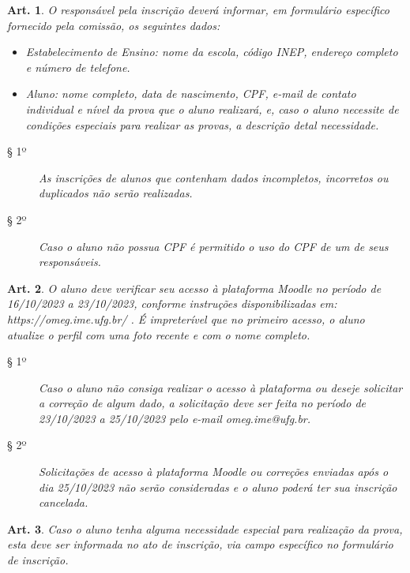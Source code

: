 \documentclass[a4paper,12pt]{article}
\newtheorem{article}{Art.}
\begin{document}
\begin{article}
  O responsável pela inscrição deverá informar, em formulário específico
  fornecido pela comissão, os seguintes dados:
  \begin{itemize}
    \item
      Estabelecimento de Ensino: nome da escola, código INEP, endereço
      completo e número de telefone.
    \item
      Aluno: nome completo, data de nascimento, CPF, e-mail de contato
      individual e nível da prova que o aluno realizará, e, caso o aluno
      necessite de condições especiais para realizar as provas, a descrição
      detal necessidade.
  \end{itemize}
  \begin{description}
    \item[§ 1º]
      As inscrições de alunos que contenham dados incompletos, incorretos ou
      duplicados não serão realizadas.
    \item[§ 2º]
      Caso o aluno não possua CPF é permitido o uso do CPF de um de seus
      responsáveis.
  \end{description}
\end{article}

\begin{article}
  O aluno deve verificar seu acesso à plataforma Moodle no período de
  16/10/2023 a 23/10/2023, conforme instruções disponibilizadas em:
  https://omeg.ime.ufg.br/ . É impreterível que no primeiro acesso, o aluno
  atualize o perfil com uma foto recente e com o nome completo.
  \begin{description}
    \item[§ 1º]
      Caso o aluno não consiga realizar o acesso à plataforma ou deseje
      solicitar a correção de algum dado, a solicitação deve ser feita no período de
      23/10/2023 a 25/10/2023 pelo e-mail omeg.ime@ufg.br.
    \item[§ 2º]
      Solicitações de acesso à plataforma Moodle ou correções enviadas
      após o dia 25/10/2023 não serão consideradas e o aluno poderá ter sua
      inscrição cancelada.
  \end{description}
\end{article}

\begin{article}
  Caso o aluno tenha alguma necessidade especial para realização da prova,
  esta deve ser informada no ato de inscrição, via campo específico no
  formulário de inscrição.
\end{article}
\end{document}
